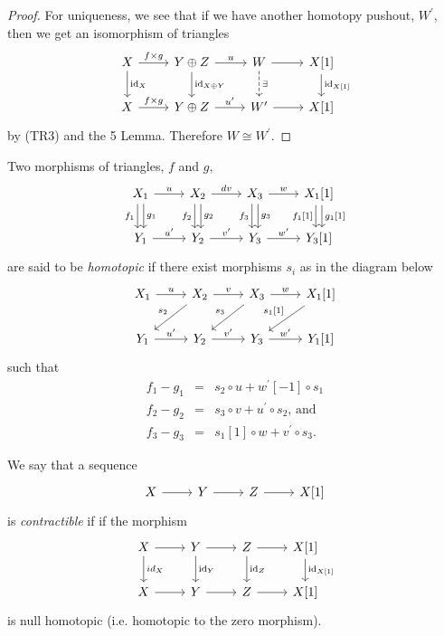 \documentclass[dissertation.tex]{subfiles}
\begin{document}
\begin{prop}
\begin{proof}
    For uniqueness, we see that if we have another homotopy pushout, $W^\prime$, then we get an isomorphism of triangles
    $$\begin{tikzcd}
      X \arrow{r}{f \times g}\arrow{d}{\id_X} & Y \oplus Z \arrow{r}{u}\arrow{d}{\id_{X \oplus Y}} & W \arrow{r}\arrow[dashed]{d}{\exists} & X[1]\arrow{d}{\id_{X[1]}}\\
      X \arrow{r}{f \times g} & Y \oplus Z \arrow{r}{u^\prime} & W^\prime \arrow{r} & X[1]
    \end{tikzcd}$$
    by (TR3) and the 5 Lemma.
    Therefore $W \cong W^\prime$.
  \end{proof}
\end{prop}

\begin{defn}
  Two morphisms of triangles, $f$ and $g$,
  $$\begin{tikzcd}
    X_1 \arrow[shift left]{d}{g_1}\arrow[shift right,swap]{d}{f_1}\arrow{r}{u}
    & X_2 \arrow[shift left]{d}{g_2}\arrow[shift right,swap]{d}{f_2}\arrow{r}{dv} 
    & X_3 \arrow[shift left]{d}{g_3}\arrow[shift right,swap]{d}{f_3}\arrow{r}{w} 
    & X_1[1]\arrow[shift left]{d}{g_1[1]}\arrow[shift right,swap]{d}{f_1[1]}\\
    Y_1 \arrow{r}{u^\prime}& Y_2\arrow{r}{v^\prime} & Y_3\arrow{r}{w^\prime} & Y_3[1]
  \end{tikzcd}$$
  are said to be {\it homotopic} if there exist morphisms $s_i$ as in the diagram below
  $$\begin{tikzcd}
    X_1 \arrow{r}{u} & X_2 \arrow{r}{v}\arrow[swap]{ld}{s_2} & X_3 \arrow[swap]{ld}{s_3}\arrow{r}{w} & X_1[1] \arrow[swap]{ld}{s_1[1]}\\
    Y_1 \arrow{r}{u^\prime} & Y_2 \arrow{r}{v^\prime} & Y_3 \arrow{r}{w^\prime} & Y_1[1]
  \end{tikzcd}$$
  such that 
  \begin{eqnarray*}
    f_1 - g_1 &=& s_2 \circ u + w^\prime[-1] \circ s_1\\
    f_2 - g_2 &=& s_3 \circ v + u^\prime \circ s_2,\,\text{and}\\
    f_3 - g_3 &=& s_1[1] \circ w + v^\prime \circ s_3.
  \end{eqnarray*}
\end{defn}

\begin{defn}
  We say that a sequence
  $$\begin{tikzcd}
    X \arrow{r} & Y \arrow{r} & Z \arrow{r} & X[1]
  \end{tikzcd}$$
  is {\it contractible} if 
  if the morphism
  $$\begin{tikzcd}
    X \arrow{d}{id_X}\arrow{r} & Y \arrow{r}\arrow{d}{\id_Y} & Z \arrow{r}\arrow{d}{\id_Z} & X[1] \arrow{d}{\id_{X[1]}}\\
    X \arrow{r} & Y \arrow{r} & Z \arrow{r} & X[1]
  \end{tikzcd}$$
  is null homotopic (i.e. homotopic to the zero morphism).
\end{defn}
\end{document}
